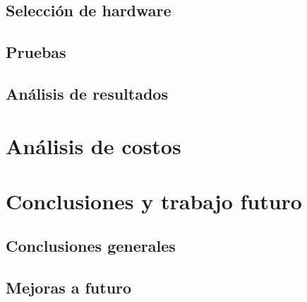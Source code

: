 \documentclass[a4paper,12pt]{report}
\begin{document}
\section{Selección de hardware}


%
%

%
%

\section{Pruebas}


\section{Análisis de resultados}




\chapter{Análisis de costos}

\chapter{Conclusiones y trabajo futuro}

\section{Conclusiones generales}




\section{Mejoras a futuro}



\end{document}
